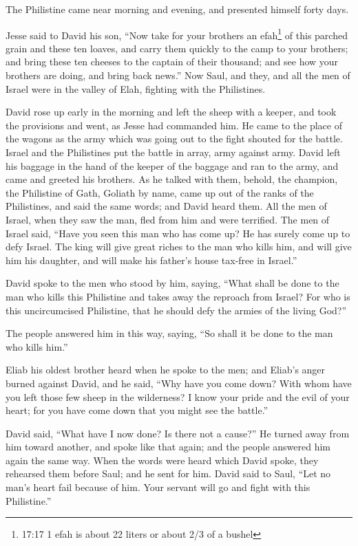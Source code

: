 \myverse{}The Philistine came near morning and evening, and presented
himself forty days.

\myverse{}Jesse said to David his son, “Now take for your brothers an
efah\footnote{17:17 1 efah is about 22 liters or about 2/3 of a bushel} of this parched grain and these ten
loaves, and carry them quickly to the camp to your brothers;
\myverse{}and bring these ten cheeses to the captain of their thousand; and see how
your brothers are doing, and bring back news.”
\myverse{}Now Saul, and they, and all the men of Israel were in the valley of Elah,
fighting with the Philistines.

\myverse{}David rose up early in the morning and left the sheep with a
keeper, and took the provisions and went, as Jesse had commanded him. He came to the place of the wagons
as the army which was going out to the fight shouted for the battle.
\myverse{}Israel and the Philistines put the battle in array, army against army.
\myverse{}David left his baggage in the hand of the keeper of the baggage and ran to
the army, and came and greeted his brothers.
\myverse{}As he talked with them, behold, the champion, the Philistine of Gath, Goliath
by name, came up out of the ranks of the Philistines, and said the same words; and David heard them.
\myverse{}All the men of Israel, when they saw the man, fled from him and were terrified.
\myverse{}The men of Israel said, “Have you seen this man who has come up? He has surely
come up to defy Israel. The king will give great riches to the man who kills him, and will give him his
daughter, and will make his father’s house tax-free in Israel.”

\myverse{}David spoke to the men who stood by him, saying, “What shall
be done to the man who kills this Philistine and takes away the reproach from Israel? For who is this
uncircumcised Philistine, that he should defy the armies of the living God?”

\myverse{}The people answered him in this way, saying, “So shall it be
done to the man who kills him.”

\myverse{}Eliab his oldest brother heard when he spoke to the men; and
Eliab’s anger burned against David, and he said, “Why have you come down? With whom have you left those
few sheep in the wilderness? I know your pride and the evil of your heart; for you have come down that
you might see the battle.”

\myverse{}David said, “What have I now done? Is there not a cause?”
\myverse{}He turned away from him toward another, and spoke like that again; and the
people answered him again the same way.
\myverse{}When the words were heard which David spoke, they rehearsed them before Saul;
and he sent for him.
\myverse{}David said to Saul, “Let no man’s heart fail because of him. Your servant
will go and fight with this Philistine.”

